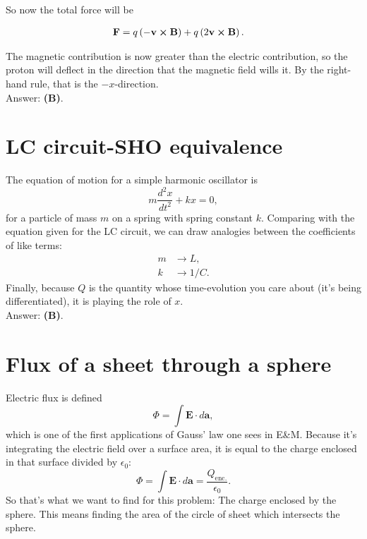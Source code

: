 \documentclass[11pt]{paper}
\newcommand{\answer}[1]{Answer: \textbf{(#1)}.}
\begin{document}
So now the total force will be

\begin{align}
\mathbf{F} &= q\left(-\mathbf{v} \cross \mathbf{B}\right)+q\left(2\mathbf{v} \cross \mathbf{B}\right).
\end{align}

The magnetic contribution is now greater than the electric contribution, so the proton will deflect in the direction that the magnetic field wills it.  By the right-hand rule, that is the $-x$-direction.\\

\answer{B}

\section{LC circuit-SHO equivalence}
The equation of motion for a simple harmonic oscillator is
\begin{equation}
m\frac{d^2x}{dt^2} + kx = 0,
\end{equation}
for a particle of mass $m$ on a spring with spring constant $k$.  Comparing with the equation given for the LC circuit, we can draw analogies between the coefficients of like terms:
\begin{align}
m &\rightarrow L,\\
k &\rightarrow 1/C.
\end{align}
Finally, because $Q$ is the quantity whose time-evolution you care about (it's being differentiated), it is playing the role of $x$.\\

\answer{B}

\section{Flux of a sheet through a sphere}
Electric flux is defined
\begin{equation}
\Phi = \int \mathbf{E}\cdot d\mathbf{a},
\end{equation}
which is one of the first applications of Gauss' law one sees in E\&M.  Because it's integrating the electric field over a surface area, it is equal to the charge enclosed in that surface divided by $\epsilon_0$:
\begin{equation}
\Phi = \int \mathbf{E}\cdot d\mathbf{a} = \frac{Q_{\text{enc.}}}{\epsilon_0}.
\end{equation}
So that's what we want to find for this problem: The charge enclosed by the sphere.  This means finding the area of the circle of sheet which intersects the sphere.
\end{document}
